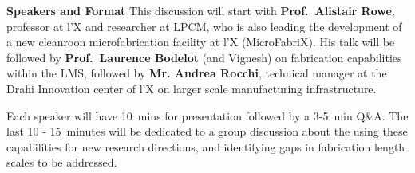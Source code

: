 \documentclass[a4paper,12pt,fleqn]{article}
\begin{document}
\begin{myhlbox}{\textbf{Speakers and Format}}
	This discussion will start with \textbf{Prof.~Alistair Rowe}, professor at l'X and researcher at LPCM, who is also leading the development of a new cleanroon microfabrication facility at l'X (MicroFabriX). His talk will be followed by \textbf{Prof.~Laurence Bodelot} (and Vignesh) on fabrication capabilities within the LMS, followed by \textbf{Mr. Andrea Rocchi}, technical manager at the Drahi Innovation center of l'X on larger scale manufacturing infrastructure. 

	Each speaker will have 10~mins for presentation followed by a 3-5~min Q\&A. The last 10 - 15~minutes will be dedicated to a group discussion about the using these capabilities for new research directions, and identifying gaps in fabrication length scales to be addressed.  
\end{myhlbox}
\end{document}
